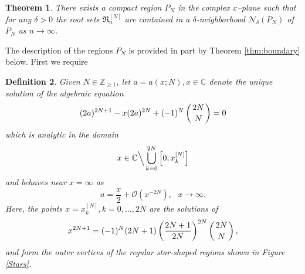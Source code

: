 \documentclass[10pt,reqno,oneside]{amsart}
\numberwithin{equation}{section}
\newtheorem{theo}{Theorem}[section]
\newtheorem{definition}[theo]{Definition}
\def\le{\left}
\def\ri{\right}
\def\bd{\begin{definition}}
\def\ed{\end{definition}}
\def\be{\begin{equation}}
\def\ee{\end{equation}}
\def\C{{\mathbb C}}
\def\Roots{\mathfrak R}
\def\binom#1#2{\le({#1 \atop #2}\ri)}
\begin{document}
\begin{theo}
There exists a compact region $P_N$ in the complex $x$--plane such that for any $\delta>0$ the root sets $\Roots_n^{[N]}$ are contained in a $\delta$-neighborhood $\mathcal N_\delta(P_N)$ of $P_N$ as $n\rightarrow\infty$.
\end{theo}

The description of the regions $P_N$ is provided in part  by Theorem \ref{thm:boundary} below. First we require 
\bd Given $N\in\mathbb{Z}_{\geq 1}$, let  $a=a(x;N),x\in\mathbb{C}$ denote the unique solution of the algebraic equation
\begin{equation}\label{i:8}
	(2a)^{2N+1}-x(2a)^{2N}+(-1)^N\binom{2N}{N}=0
\end{equation}
which is analytic in the domain 
\be\nonumber
x\in\C\Big\backslash\bigcup_{k=0}^{2N}\Big[0, x_k^{[N]}\Big]
\ee
and behaves near $x=\infty$ as 
\begin{equation}\label{pick}
	a=\frac{x}{2}+\mathcal{O}\left(x^{-2N}\right),\ \ \ x\rightarrow\infty.
\end{equation}
Here, the points $x=x_k^{[N]},k=0,\ldots,2N$  are the solutions of
\begin{equation}
\label{starcorners}
	x^{2N+1}=(-1)^{N}(2N+1)\left(\frac{2N+1}{2N}\right)^{2N}\binom{2N}{N},
\end{equation}
and form the outer vertices of the regular star-shaped regions shown in Figure \ref{Stars}.
\ed
\end{document}
